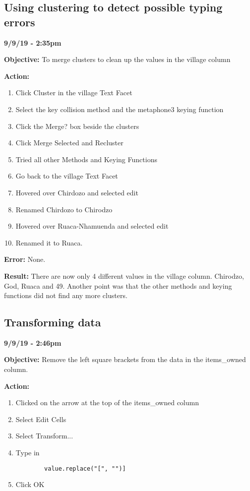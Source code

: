 \documentclass{article}
\begin{document}
\subsection{Using clustering to detect possible typing errors}

\textbf{9/9/19 - 2:35pm}

\textbf{Objective:} To merge clusters to clean up the values in the village column

\textbf{Action:}

\begin{enumerate}
    \item Click Cluster in the village Text Facet
    \item Select the key collision method and the metaphone3 keying function
    \item Click the Merge? box beside the clusters
    \item Click Merge Selected and Recluster
    \item Tried all other Methods and Keying Functions
    \item Go back to the village Text Facet
    \item Hovered over Chirdozo and selected edit
    \item Renamed Chirdozo to Chirodzo
    \item Hovered over Ruaca-Nhamuenda and selected edit
    \item Renamed it to Ruaca.
\end{enumerate}

\textbf{Error:} None.

\textbf{Result:} There are now only 4 different values in the village column. Chirodzo, God, Ruaca and 49. Another point was that the other methods and keying functions did not find any more clusters.

\subsection{Transforming data}

\textbf{9/9/19 - 2:46pm}

\textbf{Objective:} Remove the left square brackets from the data in the items\_owned column.

\textbf{Action:}

\begin{enumerate}
    \item Clicked on the arrow at the top of the items\_owned column
    \item Select Edit Cells
    \item Select Transform...
    \item Type in \begin{verbatim}
        value.replace("[", "")]
    \end{verbatim}
    \item Click OK
\end{enumerate}
\end{document}
